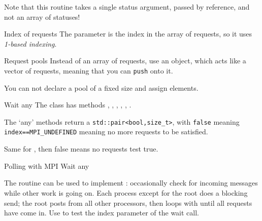 Note that this routine takes a single status argument, passed by
reference, and not an array of statuses!

\begin{fortrannote}{Index of requests}
  The  parameter is the index in the array of requests,
  so it uses \emph{1-based indexing}.

\end{fortrannote}

\begin{mplnote}{Request pools}
  \label{mpl:req_pool}
  Instead of an array of requests,
  use an  object,
  which acts like a vector of requests,
  meaning that you can \lstinline+push+ onto it.


  You can not declare a pool of a fixed size and assign elements.
\end{mplnote}

\begin{mplnote}{Wait any}
  The  class has methods
  , ,
  , ,
  , .

  The `any' methods return a \lstinline+std::pair<bool,size_t>+,
  with \lstinline{false} meaning \lstinline+index==MPI_UNDEFINED+
  meaning no more requests to be satisfied.

  Same for , then false means no requests test true.
\end{mplnote}

 {Polling with MPI Wait any}

The  routine can be used to implement
: occasionally check for incoming messages while
other work is going on.
%
%
%
Each process except for the root does a blocking send; the root
posts  from all other processors, then loops
with  until all requests have come in. Use
 to test the index parameter of the wait
call.


